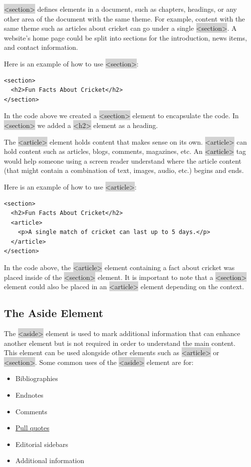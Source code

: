 \documentclass[11pt]{article}
\begin{document}
\colorbox{lightgray}{<section>} defines elements in a document, such as chapters, headings, or any other area of the document with the same theme. For example, content with the same theme such as articles about cricket can go under a single \colorbox{lightgray}{<section>}. A website’s home page could be split into sections for the introduction, news items, and contact information.

Here is an example of how to use \colorbox{lightgray}{<section>}:
\begin{lstlisting}
<section>
  <h2>Fun Facts About Cricket</h2> 
</section>
\end{lstlisting}
In the code above we created a \colorbox{lightgray}{<section>} element to encapsulate the code. In \colorbox{lightgray}{<section>} we added a \colorbox{lightgray}{<h2>} element as a heading.

The \colorbox{lightgray}{<article>} element holds content that makes sense on its own. \colorbox{lightgray}{<article>} can hold content such as articles, blogs, comments, magazines, etc. An \colorbox{lightgray}{<article>} tag would help someone using a screen reader understand where the article content (that might contain a combination of text, images, audio, etc.) begins and ends.

Here is an example of how to use \colorbox{lightgray}{<article>}:
\begin{lstlisting}
<section>
  <h2>Fun Facts About Cricket</h2>
  <article>
    <p>A single match of cricket can last up to 5 days.</p>
  </article>
</section>
\end{lstlisting}
In the code above, the \colorbox{lightgray}{<article>} element containing a fact about cricket was placed inside of the \colorbox{lightgray}{<section>} element. It is important to note that a \colorbox{lightgray}{<section>} element could also be placed in an \colorbox{lightgray}{<article>} element depending on the context.

\subsection{The Aside Element}
The \colorbox{lightgray}{<aside>} element is used to mark additional information that can enhance another element but is not required in order to understand the main content. This element can be used alongside other elements such as \colorbox{lightgray}{<article>} or \colorbox{lightgray}{<section>}. Some common uses of the \colorbox{lightgray}{<aside>} element are for:
\begin{itemize}[leftmargin = *]
\item Bibliographies
\item Endnotes
\item Comments
\item \href{https://en.wikipedia.org/wiki/Pull_quote}{Pull quotes}
\item Editorial sidebars
\item Additional information
\end{itemize}
\end{document}
